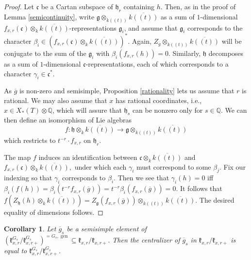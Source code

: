 \documentclass[12pt]{article}
\newcommand{\on}{\operatorname}
\newtheorem{corollary}[theorem]{Corollary}
\theoremstyle{remark}
\begin{document}
\begin{proof}
Let $\mathfrak{c}$ be a Cartan subspace of $\mathfrak{h}_r$ containing $h$. Then, as in the proof of Lemma \ref{semicontinuity}, write $\mathfrak{g}\otimes_{k((t))}\overline{k((t))}$ as a sum of $1$-dimensional $f_{x,r}(\mathfrak{c})\otimes_k\overline{k((t))}$-representations $\mathfrak{g}_i$, and assume that $\mathfrak{g}_i$ corresponds to the character $\beta_i\in(f_{x,r}(\mathfrak{c})\otimes_k\overline{k((t))})^*.$ Again, $Z_{\overline{g}}\otimes_{k((t))}\overline{k((t))}$ will be conjugate to the sum of the $\mathfrak{g}_i$ with $\beta_i(f_{x,r}(h))=0.$ Similarly, $\mathfrak{h}$ decomposes as a sum of $1$-dimensional $\mathfrak{c}$-representations, each of which corresponds to a character $\gamma_i\in\mathfrak{c}^*.$

As $\overline{g}$ is non-zero and semisimple, Proposition \ref{rationality} lets us assume that $r$ is rational. We may also assume that $x$ has rational coordinates, i.e., $x\in X_*(T)\otimes\mathbb{Q}$, which will assure that $\mathfrak{h}_s$ can be nonzero only for $s\in\mathbb{Q}$. We can then define an isomorphism of Lie algebras
\[
f:\mathfrak{h}\otimes_k\overline{k((t))}\rightarrow\mathfrak{g}\otimes_{k((t))}\overline{k((t))}
\]
which restricts to $t^{-r}\cdot f_{x,r}$ on $\mathfrak{h}_r$.

The map $f$ induces an identification between $\mathfrak{c}\otimes_k\overline{k((t))}$ and $f_{x,r}(\mathfrak{c})\otimes_k\overline{k((t))},$ under which each $\gamma_i$ must correspond to some $\beta_j$. Fix our indexing so that $\gamma_i$ corresponds to $\beta_i$. Then we see that $\gamma_i(h)=0$ iff $\beta_i(f(h))=\beta_i(t^{-r}f_{x,r}(\overline{g}))=t^{-r}\beta_i(f_{x,r}(\overline{g}))=0.$ It follows that $f(Z_{\mathfrak{h}}(h)\otimes_k\overline{k((t))})=Z_{\mathfrak{g}}(f_{x,r}(\overline{g}))\otimes_{k((t))}\overline{k((t))}.$ The desired equality of dimensions follows.
\end{proof}

\begin{corollary}\label{finiteaffinecomparison2}
Let $\overline{g}_s$ be a semisimple element of $(\mathfrak{k}_{x,r}^{G_s}/\mathfrak{k}_{x,r+}^{G_s})^{=G_s,\on{gen}}\subseteq\mathfrak{k}_{x,r}/\mathfrak{k}_{x,r+}$. Then the centralizer of $\overline{g}_s$ in $\mathfrak{k}_{x,r}/\mathfrak{k}_{x,r+}$ is equal to $\mathfrak{k}_{x,r}^{G_s}/\mathfrak{k}_{x,r+}^{G_s}$.
\end{corollary}
\end{document}
